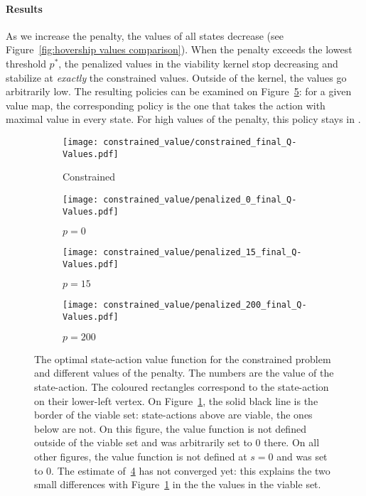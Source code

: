 \paragraph{Results} As we increase the penalty, the values of all states decrease (see Figure~\ref{fig:hovership values comparison}). When the penalty exceeds the lowest threshold $p^*$, the penalized values in the viability kernel stop decreasing and stabilize at\emph{ exactly} the constrained values. Outside of the kernel, the values go arbitrarily low. The resulting policies can be examined on Figure~\ref{fig:hovership q values}: for a given value map, the corresponding policy is the one that takes the action with maximal value in every state. For high values of the penalty, this policy stays in \QV.
\begin{figure}[!htb]
	\centering
	\begin{subfigure}{0.45\textwidth}
		\centering
		\texttt{[image: constrained\_value/constrained\_final\_Q-Values.pdf]}
		\caption{Constrained}
		\label{fig:hovership q values:constrained}
	\end{subfigure}
	\begin{subfigure}{0.45\textwidth}
		\centering
		\texttt{[image: constrained\_value/penalized\_0\_final\_Q-Values.pdf]}
		\caption{$p=0$}
		\label{fig:hovership q values:0}
	\end{subfigure}
	\newline
	\begin{subfigure}{0.45\textwidth}
		\centering
		\texttt{[image: constrained\_value/penalized\_15\_final\_Q-Values.pdf]}
		\caption{$p=15$}
		\label{fig:hovership q values:15}
	\end{subfigure}
	\begin{subfigure}{0.45\textwidth}
		\centering
		\texttt{[image: constrained\_value/penalized\_200\_final\_Q-Values.pdf]}
		\caption{$p=200$}
		\label{fig:hovership q values:200}
	\end{subfigure}
	\caption[Penalized optimal Q-value function]{The optimal state-action value function for the constrained problem and different values of the penalty. The numbers are the value of the state-action. The coloured rectangles correspond to the state-action on their lower-left vertex. On Figure~\ref{fig:hovership q values:constrained}, the solid black line is the border of the viable set: state-actions above are viable, the ones below are not. On this figure, the value function is not defined outside of the viable set and was arbitrarily set to $0$ there. On all other figures, the value function is not defined at $s=0$ and was set to $0$. The estimate of~\ref{fig:hovership q values:200} has not converged yet: this explains the two small differences with Figure~\ref{fig:hovership q values:constrained} in the the values in the viable set.}
	\label{fig:hovership q values}
\end{figure}
